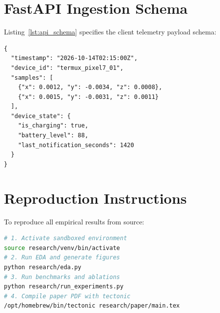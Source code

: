\documentclass[journal,11pt,onecolumn]{IEEEtran}
\begin{document}
\vspace{-0.2cm}
\noindent
\begin{minipage}[t]{0.48\textwidth}
\section{FastAPI Ingestion Schema}
\label{app:api_schemas}
Listing~\ref{lst:api_schema} specifies the client telemetry payload schema:
\begin{lstlisting}[basicstyle=\scriptsize\ttfamily, caption={Client Ingestion Schema (\texttt{POST /logs/raw.log})}, label={lst:api_schema}]
{
  "timestamp": "2026-10-14T02:15:00Z",
  "device_id": "termux_pixel7_01",
  "samples": [
    {"x": 0.0012, "y": -0.0034, "z": 0.0008},
    {"x": 0.0015, "y": -0.0031, "z": 0.0011}
  ],
  "device_state": {
    "is_charging": true,
    "battery_level": 88,
    "last_notification_seconds": 1420
  }
}
\end{lstlisting}
\end{minipage}\hfill
\begin{minipage}[t]{0.48\textwidth}
\section{Reproduction Instructions}
\label{app:reproduction}
To reproduce all empirical results from source:
\begin{lstlisting}[language=bash, basicstyle=\scriptsize\ttfamily, caption={Reproduction Suite Commands}]
# 1. Activate sandboxed environment
source research/venv/bin/activate
# 2. Run EDA and generate figures
python research/eda.py
# 3. Run benchmarks and ablations
python research/run_experiments.py
# 4. Compile paper PDF with tectonic
/opt/homebrew/bin/tectonic research/paper/main.tex
\end{lstlisting}
\end{minipage}
\end{document}

